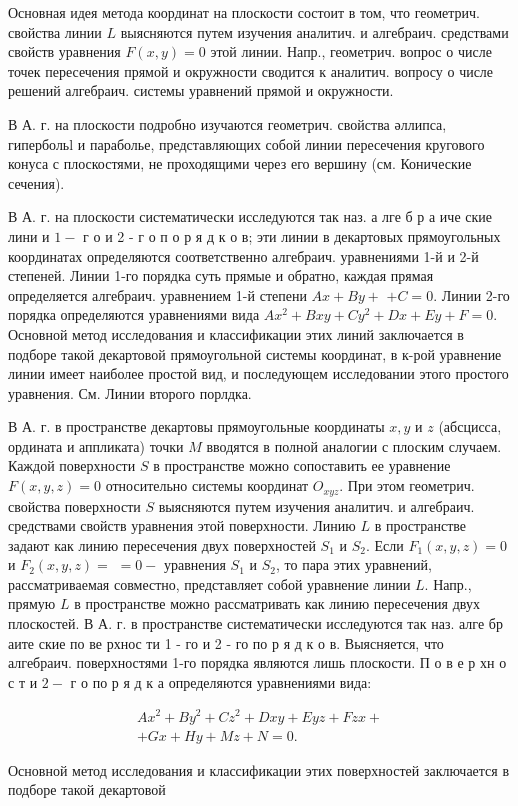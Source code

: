 \documentclass[10pt]{article}
\begin{document}
Основная идея метода координат на плоскости состоит в том, что геометрич. свойства линии $L$ выясняются путем изучения аналитич. и алгебраич. средствами свойств уравнения $F(x, y)=0$ этой линии. Напр., геометрич. вопрос о числе точек пересечения прямой и окружности сводится к аналитич. вопросу о числе решений алгебраич. системы уравнений прямой и окружности.



В А. г. на плоскости подробно изучаются геометрич. свойства әллипса, гипербольl и параболье, представляющих собой линии пересечения кругового конуса с плоскостями, не проходящими через его вершину (см. Конические сечения).



В А. г. на плоскости систематически исследуются так наз. а лге б р а иче ские лини и $1-$ г о и 2 - г о п о р я д к о в; эти линии в декартовых прямоугольных координатах определяются соответственно алгебраич. уравнениями 1-й и 2-й степеней. Линии 1-го порядка суть прямые и обратно, каждая прямая определяется алгебраич. уравнением 1-й степени $A x+B y+$ $+C=0$. Линии 2-го порядка определяются уравнениями вида $A x^{2}+B x y+C y^{2}+D x+E y+F=0$. Основной метод исследования и классификации этих линий заключается в подборе такой декартовой прямоугольной системы координат, в к-рой уравнение линии имеет наиболее простой вид, и последующем исследовании этого простого уравнения. См. Линии второго порлдка.



В А. г. в пространстве декартовы прямоугольные координаты $x, y$ и $z$ (абсцисса, ордината и аппликата) точки $M$ вводятся в полной аналогии с плоским случаем. Каждой поверхности $S$ в пространстве можно сопоставить ее уравнение $F(x, y, z)=0$ относительно системы координат $O_{x y z}$. При этом геометрич. свойства поверхности $S$ выясняются путем изучения аналитич. и алгебраич. средствами свойств уравнения этой поверхности. Линию $L$ в пространстве задают как линию пересечения двух поверхностей $S_{1}$ и $S_{2}$. Если $F_{1}(x, y, z)=0$ и $F_{2}(x, y, z)=$ $=0-$ уравнения $S_{1}$ и $S_{2}$, то пара этих уравнений, рассматриваемая совместно, представляет собой уравнение линии $L$. Напр., прямую $L$ в пространстве можно рассматривать как линию пересечения двух плоскостей. В А. г. в пространстве систематически исследуются так наз. алге бр аите ские по ве рхнос ти 1 - го и 2 - го по р я д к о в. Выясняется, что алгебраич. поверхностями 1-го порядка являются лишь плоскости. П о в е р хн о с т и $2-$ г о по р я д к а определяются уравнениями вида:



\[

\begin{gathered}

A x^{2}+B y^{2}+C z^{2}+D x y+E y z+F z x+ \\

+G x+H y+M z+N=0 .

\end{gathered}

\]



Основной метод исследования и классификации этих поверхностей заключается в подборе такой декартовой
\end{document}
